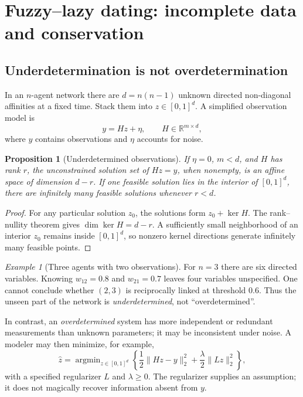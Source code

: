 \documentclass[11pt,a4paper]{article}
\numberwithin{equation}{section}
\newtheorem{proposition}[definition]{Proposition}
\theoremstyle{remark}
\newtheorem{example}[definition]{Example}
\newcommand{\R}{\mathbb{R}}
\newcommand{\1}{\mathbf{1}}
\begin{document}
\section{Fuzzy--lazy dating: incomplete data and conservation}

\subsection{Underdetermination is not overdetermination}
In an $n$-agent network there are $d=n(n-1)$ unknown directed
non-diagonal affinities at a fixed time.  Stack them into
$z\in[0,1]^d$.  A simplified observation model is
\begin{equation}\label{eq:inverse}
y=Hz+\eta,\qquad H\in\R^{m\times d},
\end{equation}
where $y$ contains observations and $\eta$ accounts for noise.

\begin{proposition}[Underdetermined observations]
If $\eta=0$, $m<d$, and $H$ has rank $r$, the unconstrained solution
set of $Hz=y$, when nonempty, is an affine space of dimension $d-r$.
If one feasible solution lies in the interior of $[0,1]^d$, there
are infinitely many feasible solutions whenever $r<d$.
\end{proposition}
\begin{proof}
For any particular solution $z_0$, the solutions form
$z_0+\ker H$.  The rank--nullity theorem gives
$\dim\ker H=d-r$.  A sufficiently small neighborhood of an
interior $z_0$ remains inside $[0,1]^d$, so nonzero kernel
directions generate infinitely many feasible points.
\end{proof}

\begin{example}[Three agents with two observations]
For $n=3$ there are six directed variables.  Knowing
$w_{12}=0.8$ and $w_{21}=0.7$ leaves four variables unspecified.
One cannot conclude whether $(2,3)$ is reciprocally linked at
threshold $0.6$.  Thus the unseen part of the network is
\emph{underdetermined}, not ``overdetermined''.
\end{example}

In contrast, an \emph{overdetermined} system has more independent or
redundant measurements than unknown parameters; it may be
inconsistent under noise.  A modeler may then minimize, for example,
\begin{equation}\label{eq:regularized}
\widehat z=\mathop{\arg\min}_{z\in[0,1]^d}
\left\{\frac12\|Hz-y\|_2^2+\frac{\lambda}{2}\|Lz\|_2^2\right\},
\end{equation}
with a specified regularizer $L$ and $\lambda\ge0$.
The regularizer supplies an assumption; it does not magically recover
information absent from $y$.
\end{document}
